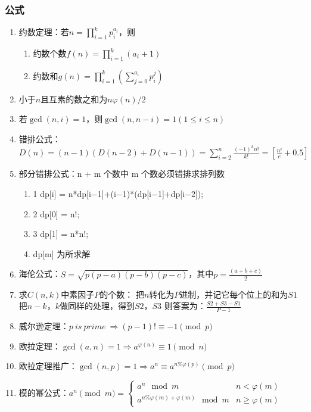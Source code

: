 \documentclass[twoside]{article}
\begin{document}
\subsubsection{公式}
\begin{enumerate}
\item 约数定理：若$n=\prod_{i=1}^kp_i^{a_i}$，则

\begin{enumerate}
\item 约数个数$f(n)=\prod_{i=1}^k(a_i+1)$
\item 约数和$g(n)=\prod_{i=1}^k(\sum_{j=0}^{a_i}p_i^j)$
\end{enumerate}

\item 小于$n$且互素的数之和为$n\varphi(n)/2$

\item 若$\gcd(n,i)=1$，则$\gcd(n,n-i)=1(1\leq i\leq n)$

\item 错排公式：$D(n)=(n-1)(D(n-2)+D(n-1))=\sum_{i=2}^n\frac{(-1)^kn!}{k!}=[\frac{n!}{e}+0.5]$

\item 部分错排公式：n + m 个数中 m 个数必须错排求排列数
\begin{enumerate}
\item 1 dp[i] = n*dp[i−1]+(i−1)*(dp[i−1]+dp[i−2]);
\item 2 dp[0] = n!;
\item 3 dp[1] = n*n!;
\item dp[m] 为所求解
\end{enumerate}


\item 海伦公式：$S =\sqrt{p(p−a)(p−b)(p−c)}$，其中$p=\frac{(a+b+c)}{2}$
\item 求$C(n,k)$中素因子$P$的个数：
把$n$转化为$P$进制，并记它每个位上的和为$S1$
把$n-k$，$k$做同样的处理，得到$S2$，$S3$
则答案为：$\frac{S2+S3-S1}{P-1}$

\item 威尔逊定理：$p\ is\ prime\ \Rightarrow (p-1)!\equiv-1\pmod p$

\item 欧拉定理：$\gcd(a,n)=1\Rightarrow a^{\varphi(n)}\equiv1\pmod n$

\item 欧拉定理推广：$\gcd(n,p)=1\Rightarrow a^n\equiv a^{n\%\varphi(p)}\pmod p$

\item 模的幂公式：$a ^ n \pmod {m} = 
\begin{cases}
a ^ n \mod m & n < \varphi(m)\\
a ^ {n \% \varphi(m) + \varphi(m)} \mod m & n \ge \varphi(m)
\end{cases}
$


\end{enumerate}
\end{document}
